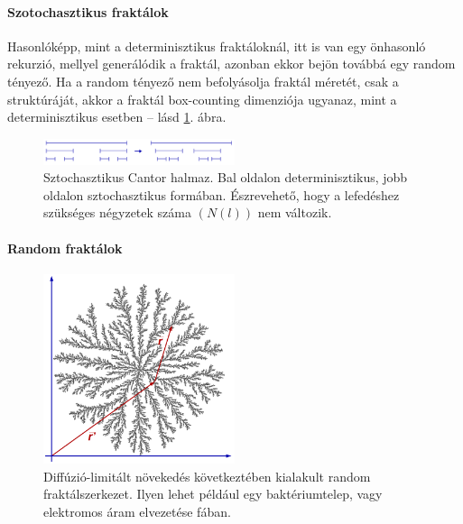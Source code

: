 \documentclass[12pt]{article}
\theoremstyle{plain}
\begin{document}
\paragraph{Szotochasztikus fraktálok}
Hasonlóképp, mint a determinisztikus fraktáloknál, itt is van egy önhasonló rekurzió, mellyel generálódik a fraktál, azonban ekkor bejön továbbá egy random tényező. Ha a random tényező nem befolyásolja fraktál méretét, csak a struktúráját, akkor a fraktál box-counting dimenziója ugyanaz, mint a determinisztikus esetben -- lásd \ref{fig:stoch_cantor}. ábra.

\begin{figure}[H]
    \begin{center}
    \includegraphics[width=0.5\textwidth]{media/stoch_cantor.png}
    \caption{Sztochasztikus Cantor halmaz. Bal oldalon determinisztikus, jobb oldalon sztochasztikus formában. Észrevehető, hogy a lefedéshez szükséges négyzetek száma $(N \left( l \right))$ nem változik.} 
    \label{fig:stoch_cantor}
    \end{center}
\end{figure}

\paragraph{Random fraktálok}

\begin{figure}[H]
    \begin{center}
    \includegraphics[width=0.5\textwidth]{media/dla_frac.png}
    \caption{Diffúzió-limitált növekedés következtében kialakult random fraktálszerkezet. Ilyen lehet például egy baktériumtelep, vagy elektromos áram elvezetése fában.}
    \label{fig:dla_frac}
    \end{center}
\end{figure}
\end{document}
